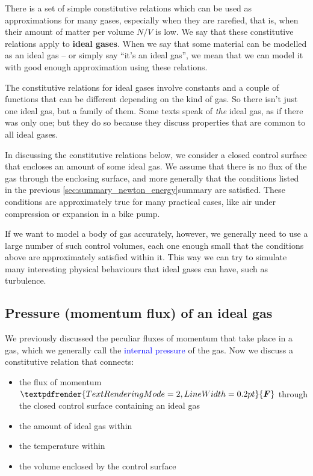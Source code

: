 \documentclass[a4paper,12pt,%
onecolumn,oneside,%
british%
]{memoir}
\renewcommand*{\bm}[1]{\textpdfrender{TextRenderingMode=2,LineWidth=0.2pt}{\boldsymbol{#1}}}
\renewcommand*{\|}[1][]{\nonscript\:#1\vert\nonscript\:\mathopen{}}
\newcommand*{\sect}{\S}%
\renewcommand*{\autoref}[3][\sect\,\ref]{\textcolor{blue}{#3}
\raisebox{0.6ex}{\color{blue}\miniscule%
\faIcon{angle-right}%
\;#1{#2}\;p.\,\pageref{#2}}}
\newcommand*{\yN}{N}
\newcommand*{\yF}{\bm{F}}
\begin{document}
There is a set of simple constitutive relations which can be used as approximations for many gases, especially when they are rarefied, that is, when their amount of matter per volume $\yN/V$ is low. We say that these constitutive relations apply to \textbf{ideal gases}. When we say that some material can be modelled as an ideal gas -- or simply say \enquote{it's an ideal gas}, we mean that we can model it with good enough approximation using these relations.

The constitutive relations for ideal gases involve constants and a couple of functions that can be different depending on the kind of gas. So there isn't just one ideal gas, but a family of them. Some texts speak of \emph{the} ideal gas, as if there was only one; but they do so because they discuss properties that are common to all ideal gases.

\medskip

In discussing the constitutive relations below, we consider a closed control surface that encloses an amount of some ideal gas. We assume that there is no flux of the gas through the enclosing surface, and more generally that the conditions listed in the previous \ref{sec:summary_newton_energy}{summary} are satisfied. These conditions are approximately true for many practical cases, like air under compression or expansion in a bike pump.

If we want to model a body of gas accurately, however, we generally need to use a large number of such control volumes, each one enough small that the conditions above are approximately satisfied within it. This way we can try to simulate many interesting physical behaviours that ideal gases can have, such as turbulence.


\subsection{Pressure (momentum flux) of an ideal gas}
\label{sec:pressure_ideal_gas}

We previously discussed the peculiar fluxes of momentum that take place in a gas, which we generally call the \autoref{def:internal_pressure}{internal pressure} of the gas. Now we discuss a constitutive relation that connects:
\begin{itemize}[nosep]
\item the flux of momentum $\yF$ through the closed control surface containing an ideal gas
\item the amount of ideal gas within
\item the temperature within
\item the volume enclosed by the control surface
\end{itemize}
\end{document}
